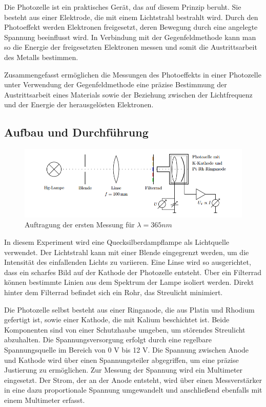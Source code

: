 \documentclass{article}
\begin{document}
Die Photozelle ist ein praktisches Gerät, das auf diesem Prinzip beruht. Sie besteht aus einer 
Elektrode, die mit einem Lichtstrahl bestrahlt wird. Durch den Photoeffekt werden Elektronen 
freigesetzt, deren Bewegung durch eine angelegte Spannung beeinflusst wird. In Verbindung mit 
der Gegenfeldmethode kann man so die Energie der freigesetzten Elektronen messen und somit die 
Austrittsarbeit des Metalls bestimmen.

Zusammengefasst ermöglichen die Messungen des Photoeffekts in einer Photozelle unter 
Verwendung der Gegenfeldmethode eine präzise Bestimmung der Austrittsarbeit eines Materials 
sowie der Beziehung zwischen der Lichtfrequenz und der Energie der herausgelösten Elektronen.

    
\clearpage
\subsection{Aufbau und Durchführung}
\begin{figure}[h!]
  \centering
  \includegraphics[width=.8\linewidth]{Aufbau_Wirkugsquantum}
  \caption{Auftragung der ersten Messung für $ \lambda =365nm$}
  \label{fig:aufbau_wirkungs}
\end{figure}

In diesem Experiment wird eine Quecksilberdampflampe als Lichtquelle verwendet. Der Lichtstrahl
 kann mit einer Blende eingegrenzt werden, um die Intensität des einfallenden Lichts zu variieren. Eine Linse wird so ausgerichtet, dass ein scharfes Bild auf der Kathode der Photozelle entsteht. Über ein Filterrad können bestimmte Linien aus dem Spektrum der Lampe isoliert werden. Direkt hinter dem Filterrad befindet sich ein Rohr, das Streulicht minimiert.

Die Photozelle selbst besteht aus einer Ringanode, die aus Platin und Rhodium gefertigt 
ist, sowie einer Kathode, die mit Kalium beschichtet ist. Beide Komponenten sind von einer 
Schutzhaube umgeben, um störendes Streulicht abzuhalten. Die Spannungsversorgung erfolgt 
durch eine regelbare Spannungsquelle im Bereich von 0 V bis 12 V. Die Spannung zwischen 
Anode und Kathode wird über einen Spannungsteiler abgegriffen, um eine präzise Justierung 
zu ermöglichen. Zur Messung der Spannung wird ein Multimeter eingesetzt. Der Strom, der 
an der Anode entsteht, wird über einen Messverstärker in eine dazu proportionale Spannung 
umgewandelt und anschließend ebenfalls mit einem Multimeter erfasst.
\end{document}
